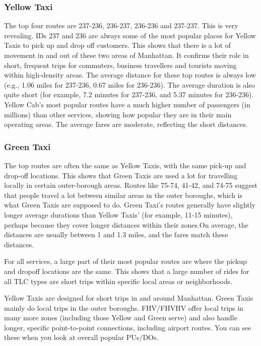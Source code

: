 \documentclass[conference]{IEEEtran}
\begin{document}
\subsubsection*{Yellow Taxi} The top four routes are 237-236, 236-237, 236-236 and 237-237. This is very revealing.
IDs 237 and 236 are always some of the most popular places for Yellow Taxis to pick up and drop off customers. This
shows that there is a lot of movement in and out of these two areas of Manhattan. It confirms their role in short,
frequent trips for commuters, business travellers and tourists moving within high-density areas.  The average distance
for these top routes is always low (e.g., 1.06 miles for 237-236, 0.67 miles for 236-236). The average duration is also
quite short (for example, 7.2 minutes for 237-236, and 5.37 minutes for 236-236). Yellow Cab's most popular routes have
a much higher number of passengers (in millions) than other services, showing how popular they are in their main
operating areas. The average fares are moderate, reflecting the short distances.

\subsubsection*{Green Taxi}  The top routes are often the same as Yellow Taxis, with the same pick-up and drop-off
locations. This shows that Green Taxis are used a lot for travelling locally in certain outer-borough areas. Routes
like 75-74, 41-42, and 74-75 suggest that people travel a lot between similar areas in the outer boroughs, which is
what Green Taxis are supposed to do. Green Taxi's routes generally have slightly longer average durations than Yellow
Taxis' (for example, 11-15 minutes), perhaps because they cover longer distances within their zones.On average, the
distances are usually between 1 and 1.3 miles, and the fares match these distances.

For all services, a large part of their most popular routes are where the pickup and dropoff locations are the same.
This shows that a large number of rides for all TLC types are short trips within specific local areas or neighborhoods.

Yellow Taxis are designed for short trips in and around Manhattan. Green Taxis mainly do local trips in the outer
boroughs. FHV/FHVHV offer local trips in many more zones (including those Yellow and Green serve) and also handle
longer, specific point-to-point connections, including airport routes. You can see these when you look at overall
popular PUs/DOs.
\end{document}
